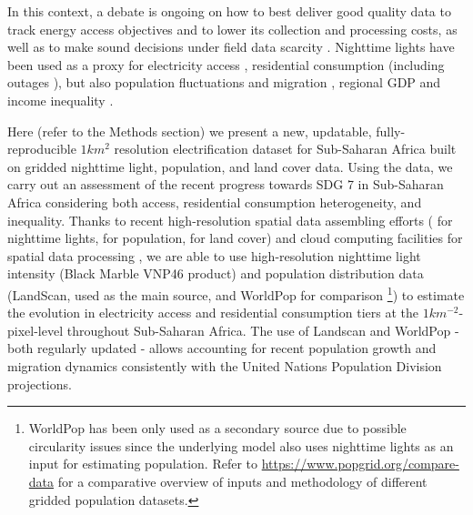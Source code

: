 \documentclass[preprint,12pt]{elsarticle}
\begin{document}
In this context, a debate is ongoing on how to best deliver good quality data to track energy access objectives and to lower its collection and processing costs, as well as to make sound decisions under field data scarcity \citep{cader_overcoming_2018}. Nighttime lights have been used as a proxy for electricity access \citep{doll_estimating_2010, elvidge_whos_2011, min_detection_2013}, residential consumption \citep{coscieme_thermodynamic_2014, he_spatiotemporal_2012, townsend_use_2010, fehrer2018spatial, shi2018exploring,baldwin2017utilizing} (including outages \citep{burke2017verification, wang2018monitoring}), but also population fluctuations and migration \citep{bharti_measuring_2016, bharti_fluctuations_2018}, regional GDP \citep{bickenbach_night_2016} and income inequality \citep{mveyange_night_2015}.

Here (refer to the Methods section) we present a new, updatable, fully-reproducible $1 km^2$ resolution electrification dataset for Sub-Saharan Africa built on gridded nighttime light, population, and land cover data. Using the data, we carry out an assessment of the recent progress towards SDG 7 in Sub-Saharan Africa considering both access, residential consumption heterogeneity, and inequality. Thanks to recent high-resolution spatial data assembling efforts (\citep{roman2018nasa} for nighttime lights, \citep{dobson2000landscan, tatem2017worldpop} for population, \citep{friedl2015mcd12q1} for land cover) and cloud computing facilities for spatial data processing \citep{gorelick2017google}, we are able to use high-resolution nighttime light intensity (Black Marble VNP46 product) and population distribution data (LandScan, used as the main source, and WorldPop for comparison \footnote{WorldPop has been only used as a secondary source due to possible circularity issues since the underlying model also uses nighttime lights as an input for estimating population. Refer to \url{https://www.popgrid.org/compare-data} for a comparative overview of inputs and methodology of different gridded population datasets.}) to estimate the evolution in electricity access and residential consumption tiers at the $1km^{-2}$-pixel-level throughout Sub-Saharan Africa. The use of Landscan and WorldPop - both regularly updated - allows accounting for recent population growth and migration dynamics consistently with the United Nations Population Division projections. 
\end{document}
